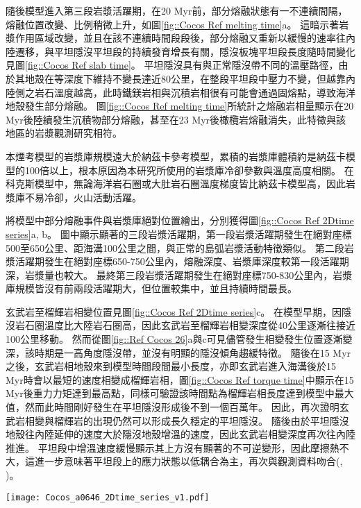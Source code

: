 隨後模型進入第三段岩漿活躍期，在20 Myr前，部分熔融狀態有一不連續間隔，熔融位置改變、比例稍微上升，如圖\ref{fig::Cocos Ref melting time}a。
這暗示著岩漿作用區域改變，並且在該不連續時間段段後，部分熔融又重新以緩慢的速率往內陸遷移，與平坦隱沒平坦段的持續發育增長有關，隱沒板塊平坦段長度隨時間變化見圖\ref{fig::Cocos Ref slab time}。
平坦隱沒具有與正常隱沒帶不同的溫壓路徑，由於其地殼在等深度下維持不變長達近80公里，在整段平坦段中壓力不變，但越靠內陸側之岩石溫度越高，此時鐵鎂岩相與沉積岩相很有可能會通過固熔點，導致海洋地殼發生部分熔融。
圖\ref{fig::Cocos Ref melting time}所統計之熔融岩相量顯示在20 Myr後陸續發生沉積物部分熔融，甚至在23 Myr後橄欖岩熔融消失，此特徵與該地區的岩漿觀測研究相符。

本煙考模型的岩漿庫規模遠大於納茲卡參考模型，累積的岩漿庫體積約是納茲卡模型的100倍以上，根本原因為本研究所使用的岩漿庫冷卻參數與溫度高度相關。
在科克斯模型中，無論海洋岩石圈或大肚岩石圈溫度梯度皆比納茲卡模型高，因此岩漿庫不易冷卻，火山活動活躍。

將模型中部分熔融事件與岩漿庫絕對位置繪出，分別獲得圖\ref{fig::Cocos Ref 2Dtime series}a, b。
圖中顯示顯著的三段岩漿活躍期，第一段岩漿活躍期發生在絕對座標500至650公里、距海溝100公里之間，與正常的島弧岩漿活動特徵類似。
第二段岩漿活躍期發生在絕對座標650-750公里內，熔融深度、岩漿庫深度較第一段活躍期深，岩漿量也較大。
最終第三段岩漿活躍期發生在絕對座標750-830公里內，岩漿庫規模皆沒有前兩段活躍期大，但位置較集中，並且持續時間最長。

玄武岩至榴輝岩相變位置見圖\ref{fig::Cocos Ref 2Dtime series}c。
在模型早期，因隱沒岩石圈溫度比大陸岩石圈高，因此玄武岩至榴輝岩相變深度從40公里逐漸往接近100公里移動。
然而從圖\ref{fig::Ref Cocos 26}a與c可見儘管發生相變發生位置逐漸變深，該時期是一高角度隱沒帶，並沒有明顯的隱沒傾角趨緩特徵。
隨後在15 Myr之後，玄武岩相地殼來到模型時間段間最小長度，亦即玄武岩進入海溝後於15 Myr時會以最短的速度相變成榴輝岩相，圖\ref{fig::Cocos Ref torque time}中顯示在15 Myr後重力力矩達到最高點，同樣可驗證該時間點為榴輝岩相長度達到模型中最大值，然而此時間剛好發生在平坦隱沒形成後不到一個百萬年。
因此，再次證明玄武岩相變與榴輝岩的出現仍然可以形成長久穩定的平坦隱沒。
隨後由於平坦隱沒地殼往內陸延伸的速度大於隱沒地殼增溫的速度，因此玄武岩相變深度再次往內陸推進。
平坦段中增溫速度緩慢顯示其上方沒有顯著的不可逆變形，因此摩擦熱不大，這進一步意味著平坦段上的應力狀態以低耦合為主，再次與觀測資料吻合(\citealp{moran2007cenozoic}, \citealp{PerezCampos2008})。

\begin{figure*}[ht]
    \centering
    \texttt{[image: Cocos\_a0646\_2Dtime\_series\_v1.pdf]}
    \caption[科克斯參考模型部分熔融、岩漿庫與玄武岩相變時空關係圖]{科克斯參考模型部分熔融、岩漿庫與玄武岩相變時空關係圖。}
    \label{fig::Cocos Ref 2Dtime series}
\end{figure*}

